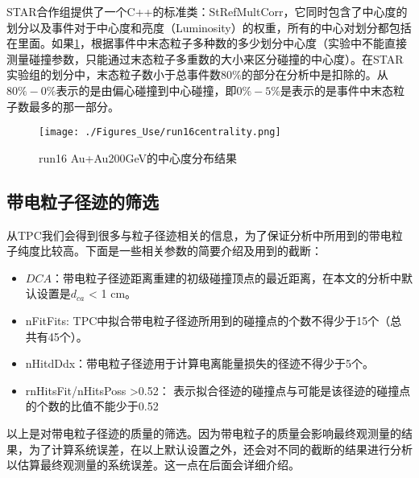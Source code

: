STAR合作组提供了一个C++的标准类：StRefMultCorr，它同时包含了中心度的划分以及事件对于中心度和亮度（Luminosity）的权重，所有的中心对划分都包括在里面。如果\ref{fig:centrality}，根据事件中末态粒子多种数的多少划分中心度（实验中不能直接测量碰撞参数，只能通过末态粒子多重数的大小来区分碰撞的中心度）。在STAR实验组的划分中，末态粒子数小于总事件数$80\%$的部分在分析中是扣除的。从$80\%-0\%$表示的是由偏心碰撞到中心碰撞，即$0\%-5\%$是表示的是事件中末态粒子数最多的那一部分。

\begin{figure}[htbp]
\centering
\texttt{[image: ./Figures\_Use/run16centrality.png]}
\caption{run16 Au+Au200GeV的中心度分布结果}
\label{fig:centrality}
\end{figure}


\subsection{带电粒子径迹的筛选}
从TPC我们会得到很多与粒子径迹相关的信息，为了保证分析中所用到的带电粒子纯度比较高。下面是一些相关参数的简要介绍及用到的截断：
\begin{itemize}
\item $DCA$：带电粒子径迹距离重建的初级碰撞顶点的最近距离，在本文的分析中默认设置是$d_{ca}$ < 1 cm。
\item nFitFits: TPC中拟合带电粒子径迹所用到的碰撞点的个数不得少于15个（总共有45个）。
\item nHitdDdx：带电粒子径迹用于计算电离能量损失的径迹不得少于5个。
\item rnHitsFit/nHitsPoss >0.52： 表示拟合径迹的碰撞点与可能是该径迹的碰撞点的个数的比值不能少于0.52%
\end{itemize}
以上是对带电粒子径迹的质量的筛选。因为带电粒子的质量会影响最终观测量的结果，为了计算系统误差，在以上默认设置之外，还会对不同的截断的结果进行分析以估算最终观测量的系统误差。这一点在后面会详细介绍。

